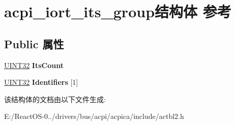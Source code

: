 \hypertarget{structacpi__iort__its__group}{}\section{acpi\+\_\+iort\+\_\+its\+\_\+group结构体 参考}
\label{structacpi__iort__its__group}
\subsection*{Public 属性}
\begin{DoxyCompactItemize}
\item 
\mbox{\label{structacpi__iort__its__group_a847460ff62558ea388aeee0f0f22cc20}} 
\hyperlink{_processor_bind_8h_ae1e6edbbc26d6fbc71a90190d0266018}{U\+I\+N\+T32} {\bfseries Its\+Count}
\item 
\mbox{\label{structacpi__iort__its__group_a3f73147c0e6fe5f27b3e8574d086f87e}} 
\hyperlink{_processor_bind_8h_ae1e6edbbc26d6fbc71a90190d0266018}{U\+I\+N\+T32} {\bfseries Identifiers} \mbox{[}1\mbox{]}
\end{DoxyCompactItemize}


该结构体的文档由以下文件生成\+:\begin{DoxyCompactItemize}
\item 
E\+:/\+React\+O\+S-\/0../drivers/bus/acpi/acpica/include/actbl2.\+h\end{DoxyCompactItemize}
